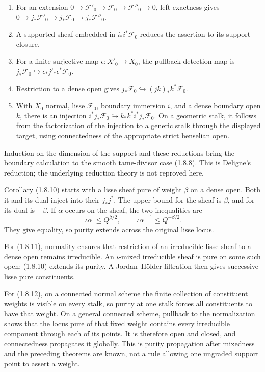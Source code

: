 \begin{enumerate}
\def\labelenumi{\arabic{enumi}.}
\tightlist
\item
  For an extension
  \(0\to\mathcal F'_0\to\mathcal F_0\to\mathcal F''_0\to0\), left
  exactness gives
  \(0\to j_*\mathcal F'_0\to j_*\mathcal F_0\to j_*\mathcal F''_0\).
\item
  A supported sheaf embedded in \(i_*i^*\mathcal F_0\) reduces the
  assertion to its support closure.
\item
  For a finite surjective map \(\epsilon:X'_0\to X_0\), the
  pullback-detection map is
  \(j_*\mathcal F_0\hookrightarrow\epsilon_*j'_*\epsilon^*\mathcal F_0\).
\item
  Restriction to a dense open gives
  \(j_*\mathcal F_0\hookrightarrow(jk)_*k^*\mathcal F_0\).
\item
  With \(X_0\) normal, lisse \(\mathcal F_0\), boundary immersion \(i\),
  and a dense boundary open \(k\), there is an injection
  \(i^*j_*\mathcal F_0\hookrightarrow k_*k^*i^*j_*\mathcal F_0\). On a
  geometric stalk, it follows from the factorization of the injection to
  a generic stalk through the displayed target, using connectedness of
  the appropriate strict henselian open.
\end{enumerate}

Induction on the dimension of the support and these reductions bring the
boundary calculation to the smooth tame-divisor case (1.8.8). This is
Deligne's reduction; the underlying reduction theory is not reproved
here.

Corollary (1.8.10) starts with a lisse sheaf pure of weight \(\beta\) on
a dense open. Both it and its dual inject into their \(j_*j^*\). The
upper bound for the sheaf is \(\beta\), and for its dual is \(-\beta\).
If \(\alpha\) occurs on the sheaf, the two inequalities are \[
|\iota\alpha|\le Q^{\beta/2},
\qquad
|\iota\alpha|^{-1}\le Q^{-\beta/2}.
\tag{DW6.2}
\] They give equality, so purity extends across the original lisse
locus.

For (1.8.11), normality ensures that restriction of an irreducible lisse
sheaf to a dense open remains irreducible. An \(\iota\)-mixed
irreducible sheaf is pure on some such open; (1.8.10) extends its
purity. A Jordan--Hölder filtration then gives successive lisse pure
constituents.

For (1.8.12), on a connected normal scheme the finite collection of
constituent weights is visible on every stalk, so purity at one stalk
forces all constituents to have that weight. On a general connected
scheme, pullback to the normalization shows that the locus pure of that
fixed weight contains every irreducible component through each of its
points. It is therefore open and closed, and connectedness propagates it
globally. This is purity propagation after mixedness and the preceding
theorems are known, not a rule allowing one ungraded support point to
assert a weight.

